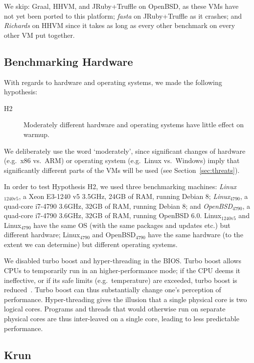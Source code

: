 \documentclass[acmsmall]{acmart}\settopmatter{printfolios=true}
\newcommand{\krun}{Krun\xspace}
\newcommand{\hyptwo}{H2\xspace}
\newcommand{\richards}{\emph{Richards}\xspace}
\newcommand{\fasta}{\emph{fasta}\xspace}
\newcommand{\bencherfive}{Linux$_\mathrm{4790}$\xspace}
\newcommand{\benchersix}{OpenBSD$_\mathrm{4790}$\xspace}
\newcommand{\bencherseven}{Linux$_\mathrm{1240v5}$\xspace}
\begin{document}
\label{openbsd porting} We skip: Graal, HHVM, and JRuby+Truffle on OpenBSD, as
these VMs have not yet been ported to this platform; \fasta on JRuby+Truffle as
it crashes; and \richards on HHVM since it takes as long as every other benchmark
on every other VM put together.


\subsection{Benchmarking Hardware}

With regards to hardware and operating systems, we made the
following hypothesis:
\begin{description}
  \item[\hyptwo] Moderately different hardware and operating systems have little effect on warmup.
\end{description}
We deliberately use the word `moderately', since significant changes of hardware
(e.g.~x86 vs.~ARM) or operating system (e.g.~Linux vs.~Windows) imply that
significantly different parts of the VMs will be used (see Section~\ref{sec:threats}).

In order to test Hypothesis \hyptwo, we used three benchmarking machines: \emph{\bencherseven}, a Xeon E3-1240 v5 3.5GHz,
24GB of RAM, running Debian 8; \emph{\bencherfive}, a quad-core i7-4790
3.6GHz, 32GB of RAM, running Debian 8; and \emph{\benchersix}, a quad-core i7-4790
3.6GHz, 32GB of RAM, running OpenBSD 6.0. \bencherseven and \bencherfive
have the same OS (with the same packages and updates etc.) but different hardware; \bencherfive
and \benchersix have the same hardware (to the extent we can determine)
but different operating systems.

We disabled turbo boost and hyper-threading in the BIOS. Turbo boost
allows CPUs to temporarily run in an higher-performance
mode; if the CPU deems it ineffective, or if its safe limits (e.g.~temperature) are exceeded,
turbo boost is reduced~\cite{charles09turboboost}. Turbo boost
can thus substantially change one's
perception of performance. Hyper-threading gives the illusion that a single
physical core is two logical cores. Programs and threads that would
otherwise run on separate physical cores are thus inter-leaved on
a single core, leading to less predictable performance.


\subsection{\krun}
\label{krun}
\end{document}
